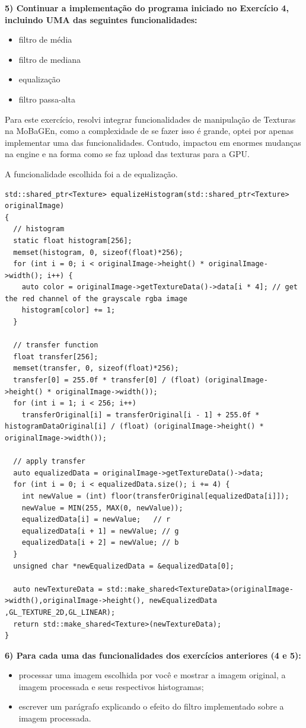 \documentclass[a4paper]{sbgames}               %
\begin{document}
\textbf{5) Continuar a implementação do programa iniciado no Exercício 4, incluindo UMA das seguintes funcionalidades:}

\begin{itemize}
\item filtro de média
\item filtro de mediana
\item equalização
\item filtro passa-alta
\end{itemize}

Para este exercício, resolvi integrar funcionalidades de manipulação de Texturas na MoBaGEn, como a complexidade de se fazer isso é grande, optei por apenas implementar uma das funcionalidades. Contudo, impactou em enormes mudanças na engine e na forma como se faz upload das texturas para a GPU.

A funcionalidade escolhida foi a de equalização.
\pagebreak
\begin{lstlisting}
std::shared_ptr<Texture> equalizeHistogram(std::shared_ptr<Texture> originalImage)
{
  // histogram
  static float histogram[256];
  memset(histogram, 0, sizeof(float)*256);
  for (int i = 0; i < originalImage->height() * originalImage->width(); i++) {
    auto color = originalImage->getTextureData()->data[i * 4]; // get the red channel of the grayscale rgba image
    histogram[color] += 1;
  }
  
  // transfer function
  float transfer[256];
  memset(transfer, 0, sizeof(float)*256);
  transfer[0] = 255.0f * transfer[0] / (float) (originalImage->height() * originalImage->width());
  for (int i = 1; i < 256; i++)
    transferOriginal[i] = transferOriginal[i - 1] + 255.0f * histogramDataOriginal[i] / (float) (originalImage->height() * originalImage->width());
  
  // apply transfer
  auto equalizedData = originalImage->getTextureData()->data;
  for (int i = 0; i < equalizedData.size(); i += 4) {
    int newValue = (int) floor(transferOriginal[equalizedData[i]]);
    newValue = MIN(255, MAX(0, newValue));
    equalizedData[i] = newValue;   // r
    equalizedData[i + 1] = newValue; // g
    equalizedData[i + 2] = newValue; // b
  }
  unsigned char *newEqualizedData = &equalizedData[0];

  auto newTextureData = std::make_shared<TextureData>(originalImage->width(),originalImage->height(), newEqualizedData ,GL_TEXTURE_2D,GL_LINEAR);
  return std::make_shared<Texture>(newTextureData);
}
\end{lstlisting}
\pagebreak
\textbf{6)  Para cada uma das funcionalidades dos exercícios anteriores (4 e 5):}
\begin{itemize}
\item processar uma imagem escolhida por você e mostrar a imagem original, a imagem processada e seus respectivos histogramas;
\item escrever um parágrafo explicando o efeito do filtro implementado sobre a imagem processada.
\end{itemize}
\end{document}
